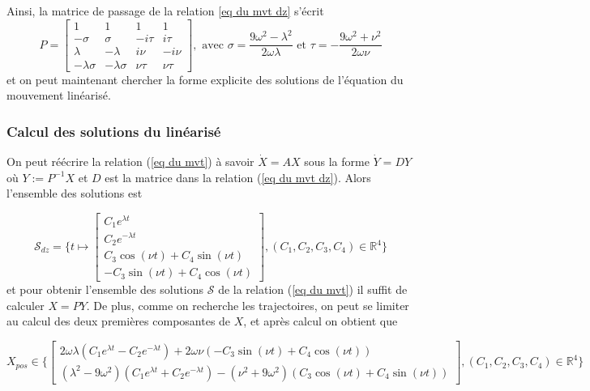 \documentclass[12pt]{article}
\theoremstyle{definition}
\theoremstyle{definition}
\begin{document}
	Ainsi, la matrice de passage de la relation \ref{eq du mvt dz} s'écrit
	\begin{equation}
		P = \begin{bmatrix}
			1 & 1 & 1 & 1 \\
			-\sigma & \sigma & -i\tau & i\tau \\
			\lambda & -\lambda & i\nu & -i\nu \\
			-\lambda\sigma & -\lambda\sigma & \nu\tau & \nu\tau
		\end{bmatrix}, \text{ avec } \sigma = \frac{9\omega^2-\lambda^2}{2\omega\lambda} \text{ et } \tau = -\frac{9\omega^2+\nu^2}{2\omega\nu}
	\end{equation}
	et on peut maintenant chercher la forme explicite des solutions de l'équation du mouvement linéarisé.
	
	\subsubsection{Calcul des solutions du linéarisé}
	On peut réécrire la relation (\ref{eq du mvt}) à savoir $\dot{X} = AX$ sous la forme $\dot{Y} = DY$ où $Y := P^{-1}X$ et $D$ est la matrice dans la relation (\ref{eq du mvt dz}). Alors l'ensemble des solutions est 
	
	\begin{equation}
		\mathcal{S}_{dz} = \{
		t \mapsto 
			\begin{bmatrix}
				C_1e^{\lambda t} \\ C_2e^{- \lambda t} \\ C_3 \cos(\nu t) + C_4 \sin(\nu t) \\ -C_3\sin(\nu t) + C_4\cos(\nu t)
			\end{bmatrix}
		, (C_1, C_2, C_3, C_4) \in \mathbb{R}^4
		\}
	\end{equation} 
	et pour obtenir l'ensemble des solutions $\mathcal{S}$ de la relation (\ref{eq du mvt}) il suffit de calculer $X = PY$. De plus, comme on recherche les trajectoires, on peut se limiter au calcul des deux premières composantes de $X$, et après calcul on obtient que
	
	\begin{equation}
		\label{forme de la solution pour la position}
		X_{pos} \in \{
		\begin{bmatrix}
			2\omega\lambda(C_1e^{\lambda t} - C_2e^{-\lambda t}) + 2\omega\nu(-C_3\sin(\nu t) + C_4\cos(\nu t))
			\\
			(\lambda^2 - 9\omega^2)(C_1e^{\lambda t} + C_2e^{-\lambda t}) - (\nu^2+9\omega^2)(C_3\cos(\nu t) + C_4\sin(\nu t))
		\end{bmatrix},
		(C_1,C_2,C_3,C_4) \in \mathbb{R}^4
		\}
	\end{equation}
	
\end{document}
